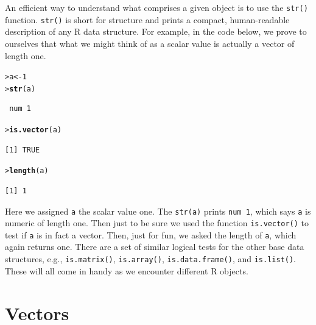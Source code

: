 \documentclass[12pt,oneside]{book}\usepackage[]{graphicx}\usepackage[]{color}
\makeatletter
\newcommand{\hlnum}[1]{\textcolor[rgb]{0.686,0.059,0.569}{#1}}%
\newcommand{\hlstd}[1]{\textcolor[rgb]{0.345,0.345,0.345}{#1}}%
\newcommand{\hlkwb}[1]{\textcolor[rgb]{0.69,0.353,0.396}{#1}}%
\newcommand{\hlkwd}[1]{\textcolor[rgb]{0.737,0.353,0.396}{\textbf{#1}}}%
\newenvironment{kframe}{%
 \def\at@end@of@kframe{}%
 \ifinner\ifhmode%
  \def\at@end@of@kframe{\end{minipage}}%
  \begin{minipage}{\columnwidth}%
 \fi\fi%
 \def\FrameCommand##1{\hskip\@totalleftmargin \hskip-\fboxsep
 \colorbox{shadecolor}{##1}\hskip-\fboxsep
     \hskip-\linewidth \hskip-\@totalleftmargin \hskip\columnwidth}%
 \MakeFramed {\advance\hsize-\width
   \@totalleftmargin\z@ \linewidth\hsize
   \@setminipage}}%
 {\par\unskip\endMakeFramed%
 \at@end@of@kframe}
\newenvironment{knitrout}{}{} %
\makeatother
\begin{document}
An efficient way to understand what comprises a given object is to use the \verb+str()+ function. \verb+str()+ is short for structure and prints a compact, human-readable description of any R data structure. For example, in the code below, we prove to ourselves that what we might think of as a scalar value is actually a vector of length one. 
\begin{knitrout}
\color{fgcolor}\begin{kframe}
\begin{alltt}
\hlstd{> }\hlstd{a} \hlkwb{<-} \hlnum{1}
\hlstd{> }\hlkwd{str}\hlstd{(a)}
\end{alltt}
\begin{verbatim}
 num 1
\end{verbatim}
\begin{alltt}
\hlstd{> }\hlkwd{is.vector}\hlstd{(a)}
\end{alltt}
\begin{verbatim}
[1] TRUE
\end{verbatim}
\begin{alltt}
\hlstd{> }\hlkwd{length}\hlstd{(a)}
\end{alltt}
\begin{verbatim}
[1] 1
\end{verbatim}
\end{kframe}
\end{knitrout}
Here we assigned \verb+a+ the scalar value one. The \verb+str(a)+ prints \verb+num 1+, which says \verb+a+ is numeric of length one. Then just to be sure we used the function \verb+is.vector()+ to test if \verb+a+ is in fact a vector. Then, just for fun, we asked the length of \verb+a+, which again returns one. There are a set of similar logical tests for the other base data structures, e.g., \verb+is.matrix()+, \verb+is.array()+, \verb+is.data.frame()+, and \verb+is.list()+. These will all come in handy as we encounter different R objects.

\section{Vectors}\label{sec:vector}
\end{document}
